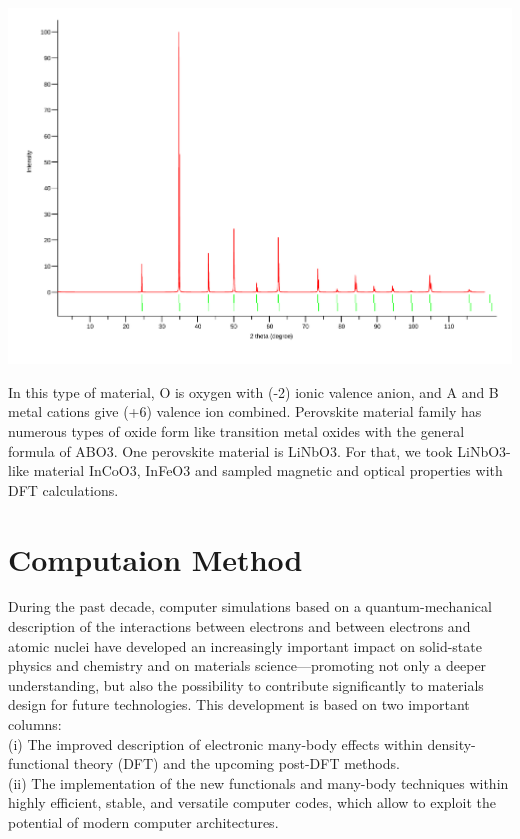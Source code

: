 \documentclass[12pt, letterpaper]{article}
\newcommand*{\1}{\hspace{1pt}}
\begin{document}
    \begin{adjustbox}{center,caption={X-Ray diffraction pattern of InFeO3},label={somelabel},nofloat=figure,vspace=\bigskipamount}
        \includegraphics[width=\textwidth]{POSCARFe}
    \end{adjustbox}

    In this type of material, O is oxygen with (-2) ionic valence anion, and A and B metal 
    cations give (+6) valence ion combined. Perovskite material family has numerous types of oxide form like transition metal oxides with the general formula of ABO3\cite{r2}.
    One perovskite material is LiNbO3. For that, we took LiNbO3-like material InCoO3, InFeO3 and sampled magnetic and optical properties with DFT calculations\cite{r3}. 
    
    \section{Computaion Method}
    During the past decade, computer simulations based on a quantum-mechanical description of the interactions between electrons 
    and between electrons and atomic nuclei have developed an increasingly important impact on solid-state physics and chemistry 
    and on materials science—promoting not only a deeper understanding, but also the possibility to contribute significantly to 
    materials design for future technologies. This development is based on two important columns: \\
    
    (i) The improved description of electronic many-body effects within density-functional theory (DFT) and the upcoming post-DFT 
    methods. \\ 
    (ii) The implementation of the new functionals and many-body techniques within highly efficient, stable, and versatile 
    computer codes, which allow to exploit the potential of modern computer architectures. \\ 
\end{document}
